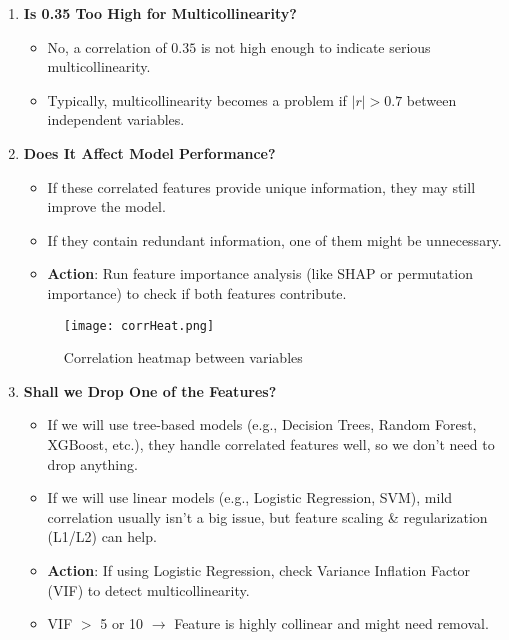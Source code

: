 \documentclass[12pt]{article}
\begin{document}
\begin{enumerate}
    \item \textbf{Is 0.35 Too High for Multicollinearity?}
    \begin{itemize}
        \item No, a correlation of $0.35$ is not high enough to indicate serious multicollinearity.
        \item Typically, multicollinearity becomes a problem if $\lvert r \rvert > 0.7$ between independent variables.
    \end{itemize}

    \item \textbf{Does It Affect Model Performance?}
    \begin{itemize}
        \item If these correlated features provide unique information, they may still improve the model.
        \item If they contain redundant information, one of them might be unnecessary.
        \item \textbf{Action}: Run feature importance analysis (like SHAP or permutation importance) to check if both features contribute.
    \end{itemize}
    
\begin{figure}[H]
    \centering
    \texttt{[image: corrHeat.png]}
    \caption{Correlation heatmap between variables}
    \label{fig:example}
\end{figure}

    \item \textbf{Shall we Drop One of the Features?}
    \begin{itemize}
        \item If we will use tree-based models (e.g., Decision Trees, Random Forest, XGBoost, etc.), they handle correlated features well, so we don’t need to drop anything.
        \item If we will use linear models (e.g., Logistic Regression, SVM), mild correlation usually isn’t a big issue, but feature scaling \& regularization (L1/L2) can help.
        \item \textbf{Action}: If using Logistic Regression, check Variance Inflation Factor (VIF) to detect multicollinearity.
        \item VIF $>$ 5 or 10 $\rightarrow$ Feature is highly collinear and might need removal.
    \end{itemize}
\end{enumerate}
\end{document}
